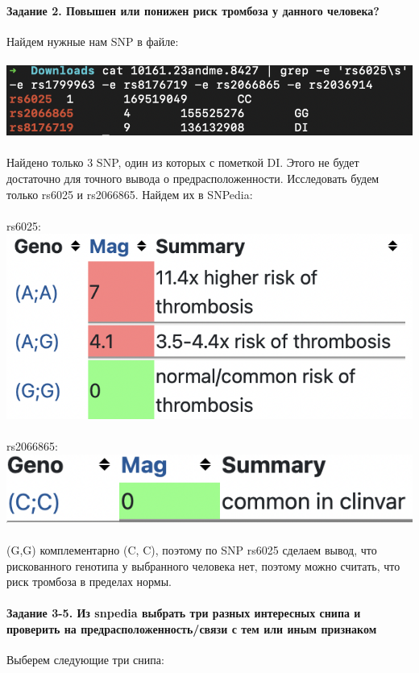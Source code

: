 \documentclass[12pt]{article}
\begin{document}
\paragraph{Задание 2. Повышен или понижен риск тромбоза у данного человека?
\\}
Найдем нужные нам SNP в файле:\\\\
\includegraphics[width=\textwidth]{images/image2.png}\\\\
Найдено только 3 SNP, один из которых с пометкой DI. Этого не будет достаточно для точного вывода о предрасположенности. Исследовать будем только rs6025 и rs2066865. Найдем их в SNPedia:\\\\
rs6025:\\
\includegraphics[width=\textwidth]{images/rs6025.png}\\\\
rs2066865:\\
\includegraphics[width=\textwidth]{images/rs2066865.png}\\\\
(G,G) комплементарно (C, C), поэтому по SNP rs6025 сделаем вывод, что рискованного генотипа у выбранного человека нет, поэтому можно считать, что риск тромбоза в пределах нормы. 
\newpage
\paragraph{Задание 3-5. Из snpedia выбрать три разных интересных снипа и проверить на предрасположенность/связи с тем или иным признаком\\}
Выберем следующие три снипа:
\end{document}
